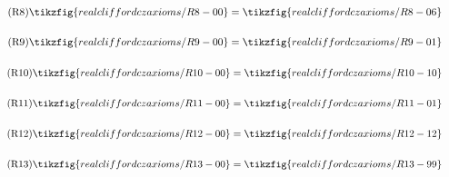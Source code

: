 \begin{figure}[ht]
{\begin{minipage}{.975\textwidth}
\begin{center}
\begin{subfigure}{0.34\textwidth}
        \end{subfigure}\vspace{-0.5em}
        \begin{subfigure}{0.52\textwidth}
            \begin{align}\label{R8}\tag{R8}\tikzfig{realcliffordczaxioms/R8-00}=\tikzfig{realcliffordczaxioms/R8-06}\end{align}
        \end{subfigure}\vspace{-0.5em}
        \begin{subfigure}{0.52\textwidth}
            \begin{align}\label{R9}\tag{R9}\tikzfig{realcliffordczaxioms/R9-00}=\tikzfig{realcliffordczaxioms/R9-01}\end{align}
        \end{subfigure}\vspace{-0.5em}
        \begin{subfigure}{0.5\textwidth}
            \begin{align}\label{R10}\tag{R10}\tikzfig{realcliffordczaxioms/R10-00}=\tikzfig{realcliffordczaxioms/R10-10}\end{align}
        \end{subfigure}\vspace{-0.5em}
        \begin{subfigure}{0.5\textwidth}
            \begin{align}\label{R11}\tag{R11}\tikzfig{realcliffordczaxioms/R11-00}=\tikzfig{realcliffordczaxioms/R11-01}\end{align}
        \end{subfigure}\vspace{-0.5em}
        \begin{subfigure}{0.64\textwidth}
            \begin{align}\label{R12}\tag{R12}\tikzfig{realcliffordczaxioms/R12-00}=\tikzfig{realcliffordczaxioms/R12-12}\end{align}
        \end{subfigure}
        \begin{subfigure}{0.34\textwidth}
            \begin{align}\label{R13}\tag{R13}\tikzfig{realcliffordczaxioms/R13-00}=\tikzfig{realcliffordczaxioms/R13-99}\end{align}
        \end{subfigure}\vspace{-0.5em}
        \begin{subfigure}{1\textwidth}

\end{subfigure}
\end{center}
\end{minipage}}
\end{figure}
